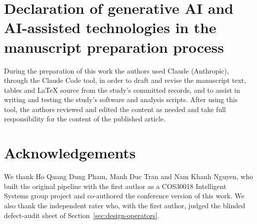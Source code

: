 \section*{Declaration of generative AI and AI-assisted technologies in the manuscript preparation process}
During the preparation of this work the authors used Claude (Anthropic), through
the Claude Code tool, in order to draft and revise the manuscript text, tables
and LaTeX source from the study's committed records, and to assist in writing
and testing the study's software and analysis scripts. After using this tool,
the authors reviewed and edited the content as needed and take full
responsibility for the content of the published article.

\section*{Acknowledgements}
We thank Ho Quang Dung Pham, Manh Duc Tran and Nam Khanh Nguyen, who built the
original pipeline with the first author as a COS30018 Intelligent Systems
group project and co-authored the conference version of this work. We also
thank the independent rater who, with the first author, judged the blinded
defect-audit sheet of Section~\ref{sec:design-operators}.
